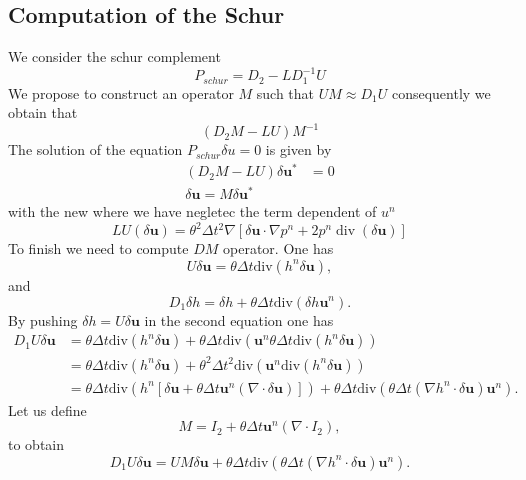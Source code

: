 \documentclass[a4paper, 11pt]{article}
\begin{document}
\subsection{Computation of the Schur}
We consider the schur complement
$$
P_{schur}=D_2-LD_1^{-1}U
$$
We propose to construct an operator $M$ such that $U M\approx D_1 U$ consequently we obtain that 
$$
(D_2 M-LU)M^{-1} 
$$
The solution of the equation $P_{schur}\delta u=0$ is given by
\begin{align*}
(D_2M-LU)\delta \boldsymbol{u}^* & =0\\
\delta \boldsymbol{u} = M \delta \boldsymbol{u}^*
\end{align*}
with the new where we have negletec the term dependent of $u^n$
\begin{equation*}
LU(\delta \boldsymbol{u})=\theta^2 \Delta t^2 \nabla\left[ \delta \boldsymbol{u}\cdot \nabla p^n + 2p^n \operatorname{div}(\delta \boldsymbol{u}) \right]
\end{equation*}
To finish we need to compute $DM$ operator. One has 
\begin{equation*}
U\delta \boldsymbol{u}=\theta\Delta t\text{div}(h^n\delta \boldsymbol{u}),
\end{equation*}
and 
\begin{equation*}
D_1\delta h=\delta h+\theta\Delta t\text{div}(\delta h\boldsymbol{u}^n).
\end{equation*}
By pushing $\delta h=U\delta \boldsymbol{u}$ in the second equation one has
\begin{equation*}
\begin{split}
D_1U\delta \boldsymbol{u}&=\theta\Delta t\text{div}(h^n\delta \boldsymbol{u})+\theta\Delta t\text{div}(\boldsymbol{u}^n\theta\Delta t\text{div}(h^n\delta \boldsymbol{u}))\\
&=\theta\Delta t\text{div}(h^n\delta \boldsymbol{u})+\theta^2\Delta t^2\text{div}(\boldsymbol{u}^n\text{div}(h^n\delta\boldsymbol{u}))\\
&=\theta\Delta t\text{div}\left(h^n\left[\delta \boldsymbol{u}+\theta\Delta t\boldsymbol{u}^n(\nabla\cdot \delta \boldsymbol{u})\right]\right)+\theta\Delta t\text{div}(\theta\Delta t\left(\nabla h^n\cdot \delta \boldsymbol{u}\right)\boldsymbol{u}^n).
\end{split}
\end{equation*}
Let us define 
\begin{equation*}
M=I_2+\theta\Delta t\boldsymbol{u}^n(\nabla\cdot I_2),
\end{equation*}
to obtain
\begin{equation*}
D_1U\delta \boldsymbol{u}=UM\delta \boldsymbol{u}+\theta\Delta t\text{div}(\theta\Delta t\left(\nabla h^n\cdot \delta \boldsymbol{u}\right)\boldsymbol{u}^n).
\end{equation*}
\end{document}
